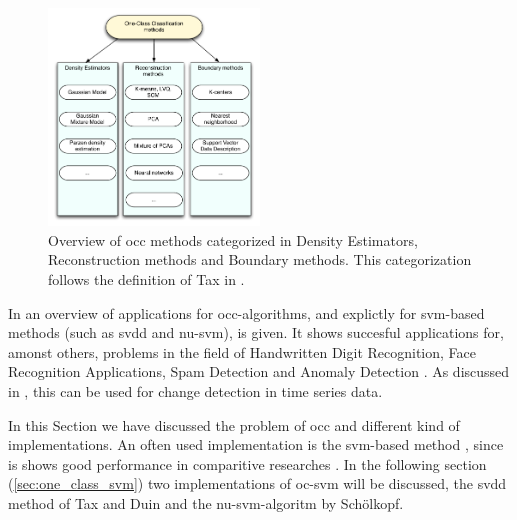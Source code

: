 \begin{figure}
  \centering
    \includegraphics[width=0.5\textwidth,keepaspectratio]{./Figures/chapter3/occ_methods.pdf}
  \caption[\gls{occ} methods]{Overview of \gls{occ} methods categorized in Density Estimators, Reconstruction methods and Boundary methods. This categorization follows the definition of Tax in \cite{tax2001one}.}
  \label{fig:occ-methods}
\end{figure}

In \cite{khan2010survey,noumir2012simple} an overview of applications for \gls{occ}-algorithms, and explictly for \gls{svm}-based methods (such as \gls{svdd} and \gls{nu-svm}), is given.
It shows succesful applications for, amonst others, problems in the field of Handwritten Digit Recognition, Face Recognition Applications, Spam Detection and Anomaly Detection \cite{li2003improving,perdisci2006using}.
As discussed in , this can be used for change detection in time series data.

In this Section we have discussed the problem of \gls{occ} and different kind of implementations.
An often used implementation is the \gls{svm}-based method \cite{noumir2012simple}, since is shows good performance in comparitive researches \cite{khan2010survey,smola1998connection}.
In the following section (\ref{sec:one_class_svm}) two implementations of \gls{oc-svm} will be discussed, the \gls{svdd} method of Tax and Duin \cite{tax1999support} and the \gls{nu-svm}-algoritm by Sch\"olkopf.






